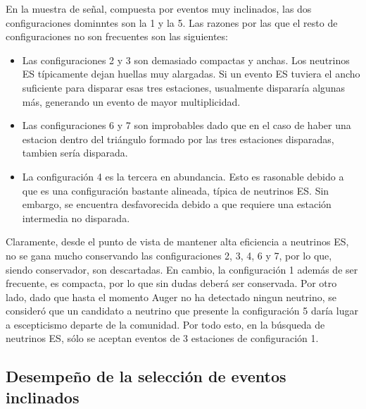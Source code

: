 		En la muestra de señal, compuesta por eventos muy inclinados, las dos configuraciones dominntes son la 1 y la 5. Las razones por las que el resto de configuraciones no son frecuentes son las siguientes:
		\begin{itemize}
		 \item Las configuraciones 2 y 3 son demasiado compactas y anchas. Los neutrinos ES típicamente dejan huellas muy alargadas. Si un evento ES tuviera el ancho suficiente para disparar esas tres estaciones, usualmente dispararía algunas más, generando un evento de mayor multiplicidad.
		 \item Las configuraciones 6 y 7 son improbables dado que en el caso de haber una estacion dentro del triángulo formado por las tres estaciones disparadas, tambien sería disparada.
		 \item La configuración 4 es la tercera en abundancia. Esto es rasonable debido a que es una configuración bastante alineada, típica de neutrinos ES. Sin embargo, se encuentra desfavorecida debido a que requiere una estación intermedia no disparada.
		\end{itemize}
		
		Claramente, desde el punto de vista de mantener alta eficiencia a neutrinos ES, no se gana mucho conservando las configuraciones 2, 3, 4, 6 y 7, por lo que, siendo conservador, son descartadas.
		En cambio, la configuración 1 además de ser frecuente, es compacta, por lo que sin dudas deberá ser conservada.
		Por otro lado, dado que hasta el momento Auger no ha detectado ningun neutrino, se consideró que un candidato a neutrino que presente la configuración 5 daría lugar a escepticismo departe de la comunidad. Por todo esto, en la búsqueda de neutrinos ES, sólo se aceptan eventos de 3 estaciones de configuración 1.
		
		\subsection{Desempeño de la selección de eventos inclinados}
		
